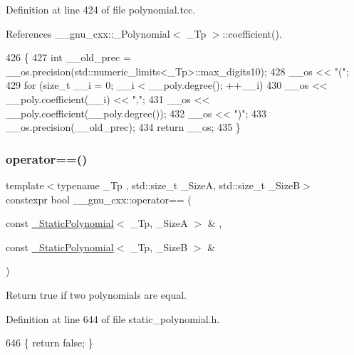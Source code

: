 Definition at line 424 of file polynomial.\+tcc.



References \+\_\+\+\_\+gnu\+\_\+cxx\+::\+\_\+\+Polynomial$<$ \+\_\+\+Tp $>$\+::coefficient().


\begin{DoxyCode}
426     \{
427       \textcolor{keywordtype}{int} \_\_old\_prec = \_\_os.precision(std::numeric\_limits<\_Tp>::max\_digits10);
428       \_\_os << \textcolor{stringliteral}{"("};
429       \textcolor{keywordflow}{for} (\textcolor{keywordtype}{size\_t} \_\_i = 0; \_\_i < \_\_poly.degree(); ++\_\_i)
430         \_\_os << \_\_poly.coefficient(\_\_i) << \textcolor{stringliteral}{","};
431       \_\_os << \_\_poly.coefficient(\_\_poly.degree());
432       \_\_os << \textcolor{stringliteral}{")"};
433       \_\_os.precision(\_\_old\_prec);
434       \textcolor{keywordflow}{return} \_\_os;
435     \}
\end{DoxyCode}
\mbox{\label{namespace____gnu__cxx_a316d841c3d2addecec46960379815cd4}} 
\subsubsection{\texorpdfstring{operator==()}{operator==()}\hspace{0.1cm}{\footnotesize\ttfamily [1/3]}}
{\footnotesize\ttfamily template$<$typename \+\_\+\+Tp , std\+::size\+\_\+t \+\_\+\+SizeA, std\+::size\+\_\+t \+\_\+\+SizeB$>$ \\
constexpr bool \+\_\+\+\_\+gnu\+\_\+cxx\+::operator== (\begin{DoxyParamCaption}\item[{const \hyperlink{class____gnu__cxx_1_1__StaticPolynomial}{\+\_\+\+Static\+Polynomial}$<$ \+\_\+\+Tp, \+\_\+\+SizeA $>$ \&}]{,  }\item[{const \hyperlink{class____gnu__cxx_1_1__StaticPolynomial}{\+\_\+\+Static\+Polynomial}$<$ \+\_\+\+Tp, \+\_\+\+SizeB $>$ \&}]{ }\end{DoxyParamCaption})\hspace{0.3cm}{\ttfamily [inline]}}

Return true if two polynomials are equal. 

Definition at line 644 of file static\+\_\+polynomial.\+h.


\begin{DoxyCode}
646     \{ \textcolor{keywordflow}{return} \textcolor{keyword}{false}; \}
\end{DoxyCode}
\mbox{\label{namespace____gnu__cxx_a4156deb610ec73be9e2f56a1a4caf391}} 

